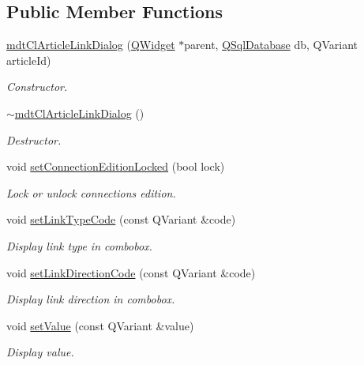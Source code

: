 \subsection*{Public Member Functions}
\begin{DoxyCompactItemize}
\item 
\hyperlink{classmdt_cl_article_link_dialog_a6543c22308fff67f98c9d42581a10de7}{mdt\-Cl\-Article\-Link\-Dialog} (\hyperlink{class_q_widget}{Q\-Widget} $\ast$parent, \hyperlink{class_q_sql_database}{Q\-Sql\-Database} db, Q\-Variant article\-Id)
\begin{DoxyCompactList}\small\item\em Constructor. \end{DoxyCompactList}\item 
\hyperlink{classmdt_cl_article_link_dialog_ab245318cbe47717ac42a57becfcf1688}{$\sim$mdt\-Cl\-Article\-Link\-Dialog} ()
\begin{DoxyCompactList}\small\item\em Destructor. \end{DoxyCompactList}\item 
void \hyperlink{classmdt_cl_article_link_dialog_a4f7c3b2600d82fe264fcfe7871020d32}{set\-Connection\-Edition\-Locked} (bool lock)
\begin{DoxyCompactList}\small\item\em Lock or unlock connections edition. \end{DoxyCompactList}\item 
void \hyperlink{classmdt_cl_article_link_dialog_a47d02d3d5a01dc5d2a764a68c376f0f4}{set\-Link\-Type\-Code} (const Q\-Variant \&code)
\begin{DoxyCompactList}\small\item\em Display link type in combobox. \end{DoxyCompactList}\item 
void \hyperlink{classmdt_cl_article_link_dialog_ae911aa98e97e83ea6691facbb9c4762d}{set\-Link\-Direction\-Code} (const Q\-Variant \&code)
\begin{DoxyCompactList}\small\item\em Display link direction in combobox. \end{DoxyCompactList}\item 
void \hyperlink{classmdt_cl_article_link_dialog_aa609d5af478e7103b138e9a6a245df53}{set\-Value} (const Q\-Variant \&value)
\begin{DoxyCompactList}\small\item\em Display value. \end{DoxyCompactList}\item 

\end{DoxyCompactItemize}
